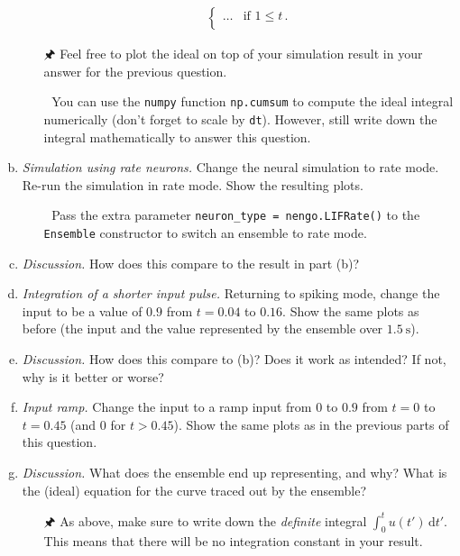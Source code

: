 \begin{enumerate}[a)]
\begin{itemize}
\begin{align*}
\begin{cases}
					\ldots & \text{if } 1 \leq t \,.\\
				\end{cases}
			\end{align*}
			\item[{\symbolfont 🖈}] Feel free to plot the ideal on top of your simulation result in your answer for the previous question.
			\item[{\symbolfont 🐍}] You can use the \texttt{numpy} function \texttt{np.cumsum} to compute the ideal integral numerically (don't forget to scale by \texttt{dt}). However, still write down the integral mathematically to answer this question.
		\end{itemize}
		\item {} \emph{Simulation using rate neurons.} Change the neural simulation to rate mode. Re-run the simulation in rate mode. Show the resulting plots.
		\begin{itemize}
			\item[{\symbolfont 🐍}] Pass the extra parameter \texttt{neuron\_type = nengo.LIFRate()} to the \texttt{Ensemble} constructor to switch an ensemble to rate mode.
		\end{itemize}
		\item {} \emph{Discussion.} How does this compare to the result in part (b)?
		\item {} \emph{Integration of a shorter input pulse.} Returning to spiking mode, change the input to be a value of $0.9$ from $t=0.04$ to $0.16$. Show the same plots as before (the input and the value represented by the ensemble over $\SI{1.5}{\second}$). 
		\item {} \emph{Discussion.} How does this compare to (b)? Does it work as intended? If not, why is it better or worse?
		\item {} \emph{Input ramp.} Change the input to a ramp input from $0$ to $0.9$ from $t=0$ to $t=0.45$ (and $0$ for $t>0.45$). Show the same plots as in the previous parts of this question.
		\item {} \emph{Discussion.} What does the ensemble end up representing, and why? What is the (ideal) equation for the curve traced out by the ensemble? 
		\begin{itemize}
			\item[{\symbolfont 🖈}] As above, make sure to write down the \emph{definite} integral $\int_0^t u(t') \,\mathrm{d}t'$. This means that there will be no integration constant in your result.
		\end{itemize}

\end{enumerate}
